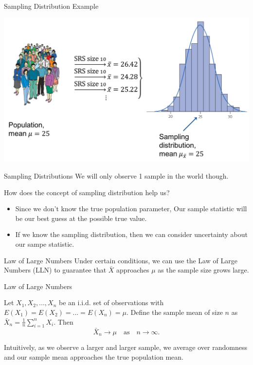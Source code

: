 \documentclass{beamer}
\begin{document}
\begin{frame}{Sampling Distribution Example}
	\begin{center}
		\includegraphics[width=1\textwidth]{samplingdistnofxbar.png}
	\end{center}
\end{frame}

\begin{frame}{Sampling Distributions}
	We will only observe 1 sample in the world though. 
	
	How does the concept of sampling distribution help us?
	\pause
	
	\begin{itemize}
		\item Since we don't know the true population parameter, Our sample statistic will be our best guess at the possible true value.
		
		\item If we know the sampling distribution, then we can consider uncertainty about our sampe statistic.
	\end{itemize}
\end{frame}

\begin{frame}{Law of Large Numbers}
	Under certain conditions, we can use the \alert{Law of Large Numbers (LLN)} to guarantee that $\bar{X}$ approaches $\mu$ as the sample size grows large.
\end{frame}

\begin{frame}{Law of Large Numbers}
	\begin{theorem}
		\vspace{2.5mm}
		Let $X_1,X_2,...,X_n$ be an i.i.d. set of observations with $E(X_1) = E(X_2) = ... = E(X_n) = \mu$. Define the sample mean of size $n$ as $\bar{X}_n = \frac{1}{n}\sum_{i = 1}^{n}X_i$. Then
		\[ \bar{X}_n \to \mu \quad \text{as} \quad n \to \infty. \]
	\end{theorem}
	
	Intuitively, as we observe a larger and larger sample, we average over randomness and our sample mean approaches the true population mean. 
\end{frame}
\end{document}
